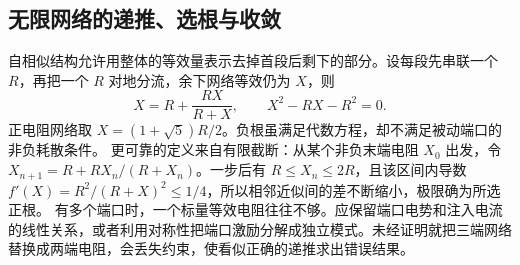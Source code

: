\subsection{无限网络的递推、选根与收敛}
自相似结构允许用整体的等效量表示去掉首段后剩下的部分。设每段先串联一个 $R$，再把一个 $R$ 对地分流，余下网络等效仍为 $X$，则
\[
 X=R+\frac{RX}{R+X},\qquad X^2-RX-R^2=0.
\]
正电阻网络取 $X=(1+\sqrt5)R/2$。负根虽满足代数方程，却不满足被动端口的非负耗散条件。
更可靠的定义来自有限截断：从某个非负末端电阻 $X_0$ 出发，令 $X_{n+1}=R+RX_n/(R+X_n)$。一步后有 $R\le X_n\le2R$，且该区间内导数
$f'(X)=R^2/(R+X)^2\le1/4$，所以相邻近似间的差不断缩小，极限确为所选正根。
有多个端口时，一个标量等效电阻往往不够。应保留端口电势和注入电流的线性关系，或者利用对称性把端口激励分解成独立模式。未经证明就把三端网络替换成两端电阻，会丢失约束，使看似正确的递推求出错误结果。

